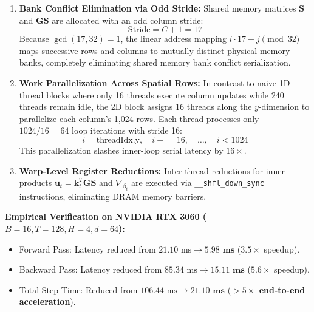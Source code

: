 \documentclass[11pt,a4paper]{article}
\begin{document}
\begin{enumerate}
    \item \textbf{Bank Conflict Elimination via Odd Stride:} Shared memory matrices $\mathbf{S}$ and $\mathbf{GS}$ are allocated with an odd column stride:
    \begin{equation}
        \text{Stride} = C + 1 = 17
    \end{equation}
    Because $\gcd(17, 32) = 1$, the linear address mapping $i \cdot 17 + j \pmod{32}$ maps successive rows and columns to mutually distinct physical memory banks, completely eliminating shared memory bank conflict serialization.
    \item \textbf{Work Parallelization Across Spatial Rows:} In contrast to naive 1D thread blocks where only 16 threads execute column updates while 240 threads remain idle, the 2D block assigns 16 threads along the $y$-dimension to parallelize each column's 1,024 rows. Each thread processes only $1024 / 16 = 64$ loop iterations with stride 16:
    \begin{equation}
        i = \text{threadIdx.y}, \quad i \mathrel{+}= 16, \quad \dots, \quad i < 1024
    \end{equation}
    This parallelization slashes inner-loop serial latency by $16\times$.
    \item \textbf{Warp-Level Register Reductions:} Inter-thread reductions for inner products $\mathbf{u}_t = \mathbf{k}_t^T \mathbf{GS}$ and $\nabla_{\beta_t}$ are executed via \texttt{\_\_shfl\_down\_sync} instructions, eliminating DRAM memory barriers.
\end{enumerate}

\textbf{Empirical Verification on NVIDIA RTX 3060 ($B=16, T=128, H=4, d=64$):}
\begin{itemize}
    \item Forward Pass: Latency reduced from $21.10\text{ ms} \to \mathbf{5.98\text{ ms}}$ ($3.5\times$ speedup).
    \item Backward Pass: Latency reduced from $85.34\text{ ms} \to \mathbf{15.11\text{ ms}}$ ($5.6\times$ speedup).
    \item Total Step Time: Reduced from $106.44\text{ ms} \to \mathbf{21.10\text{ ms}}$ (\textbf{$>5\times$ end-to-end acceleration}).
\end{itemize}
\end{document}
